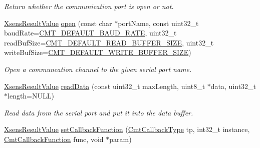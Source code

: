 \begin{DoxyCompactItemize}
\begin{DoxyCompactList}\small\item\em \-Return whether the communication port is open or not. \end{DoxyCompactList}\item 
\hyperlink{group__enums_ga822a2260a20af524029eef9e9a51ff6f}{\-Xsens\-Result\-Value} \hyperlink{classxsens_1_1Cmt1s_a31c11cd69aba26459cbd57b5f55b4797}{open} (const char $\ast$port\-Name, const uint32\-\_\-t baud\-Rate=\hyperlink{cmtdef_8h_a56b1b182fb05cb2746c0a29ab5bae7ed}{\-C\-M\-T\-\_\-\-D\-E\-F\-A\-U\-L\-T\-\_\-\-B\-A\-U\-D\-\_\-\-R\-A\-T\-E}, uint32\-\_\-t read\-Buf\-Size=\hyperlink{cmtdef_8h_a59c570baa7aed9a7ca80039ea2eddef7}{\-C\-M\-T\-\_\-\-D\-E\-F\-A\-U\-L\-T\-\_\-\-R\-E\-A\-D\-\_\-\-B\-U\-F\-F\-E\-R\-\_\-\-S\-I\-Z\-E}, uint32\-\_\-t write\-Buf\-Size=\hyperlink{cmtdef_8h_aa23bbf277ce62aa44a107c5c873d0dcd}{\-C\-M\-T\-\_\-\-D\-E\-F\-A\-U\-L\-T\-\_\-\-W\-R\-I\-T\-E\-\_\-\-B\-U\-F\-F\-E\-R\-\_\-\-S\-I\-Z\-E})
\begin{DoxyCompactList}\small\item\em \-Open a communcation channel to the given serial port name. \end{DoxyCompactList}\item 
\hyperlink{group__enums_ga822a2260a20af524029eef9e9a51ff6f}{\-Xsens\-Result\-Value} \hyperlink{classxsens_1_1Cmt1s_a2237eef35fbf249e18fa3e50474bf8ea}{read\-Data} (const uint32\-\_\-t max\-Length, uint8\-\_\-t $\ast$data, uint32\-\_\-t $\ast$length=\-N\-U\-L\-L)
\begin{DoxyCompactList}\small\item\em \-Read data from the serial port and put it into the data buffer. \end{DoxyCompactList}\item 
\hypertarget{classxsens_1_1Cmt1s_aee6932a0426acd3bffe30ebc6699dba9}{\hyperlink{group__enums_ga822a2260a20af524029eef9e9a51ff6f}{\-Xsens\-Result\-Value} \hyperlink{classxsens_1_1Cmt1s_aee6932a0426acd3bffe30ebc6699dba9}{set\-Callback\-Function} (\hyperlink{cmtdef_8h_a3944c5bada7f23f30534019faf605174}{\-Cmt\-Callback\-Type} tp, int32\-\_\-t instance, \hyperlink{cmtdef_8h_a83bf10c11731ef4cd254260e7e4d13c7}{\-Cmt\-Callback\-Function} func, void $\ast$param)}\label{classxsens_1_1Cmt1s_aee6932a0426acd3bffe30ebc6699dba9}


\end{DoxyCompactItemize}
